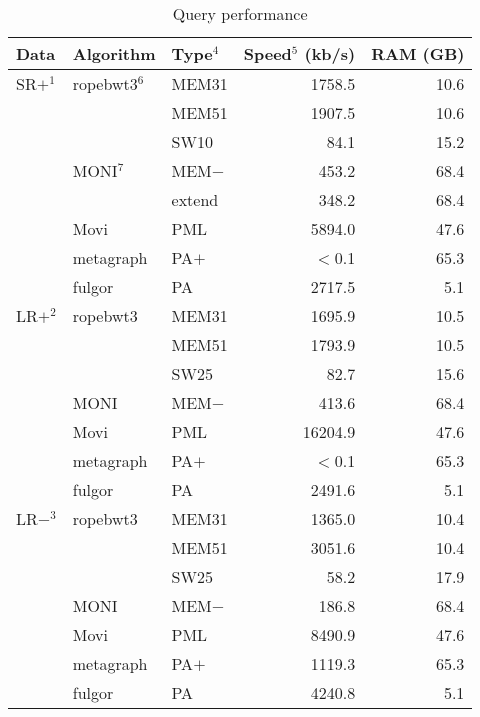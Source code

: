 \documentclass[webpdf,contemporary,large,namedate]{oup-authoring-template}%
\begin{document}
\begin{table}[!tb]
\caption{Query performance\label{tab:query}}
\begin{tabular*}{\columnwidth}{@{\extracolsep\fill}lllrr@{\extracolsep\fill}}
\toprule
Data   & Algorithm     &Type$^4$&Speed$^5$ (kb/s)&RAM (GB) \\
\midrule
SR$+^1$& ropebwt3$^6$  & MEM31  & 1758.5       &  10.6 \\
       &               & MEM51  & 1907.5       &  10.6 \\
	   &               & SW10   & 84.1         &  15.2 \\
	   & MONI$^7$      & MEM$-$ & 453.2        &  68.4 \\
	   &               & extend & 348.2        &  68.4 \\
       & Movi          & PML    & 5894.0       &  47.6 \\
	   & metagraph     & PA$+$  & $<$0.1       &  65.3 \\
	   & fulgor        & PA     & 2717.5       &   5.1 \\
LR$+^2$& ropebwt3      & MEM31  & 1695.9       &  10.5 \\
       &               & MEM51  & 1793.9       &  10.5 \\
       &               & SW25   & 82.7         &  15.6 \\
	   & MONI          & MEM$-$ & 413.6        &  68.4 \\
	   & Movi          & PML    & 16204.9      &  47.6 \\
	   & metagraph     & PA$+$  & $<$0.1       &  65.3 \\
	   & fulgor        & PA     & 2491.6       &   5.1 \\
LR$-^3$& ropebwt3      & MEM31  & 1365.0       &  10.4 \\
       &               & MEM51  & 3051.6       &  10.4 \\
	   &               & SW25   & 58.2         &  17.9 \\
	   & MONI          & MEM$-$ & 186.8        &  68.4 \\
	   & Movi          & PML    & 8490.9       &  47.6 \\
	   & metagraph     & PA$+$  & 1119.3       &  65.3 \\
	   & fulgor        & PA     & 4240.8       &   5.1 \\

\end{tabular*}
\end{table}
\end{document}
